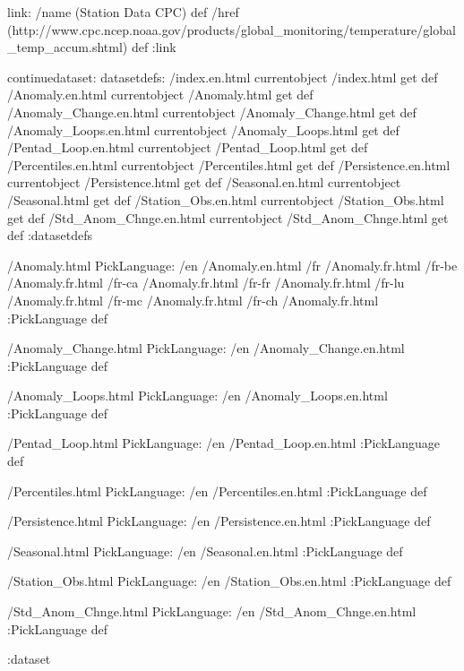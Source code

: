 
\begin{ingrid}
link:
/name (Station Data CPC) def
/href (http://www.cpc.ncep.noaa.gov/products/global_monitoring/temperature/global_temp_accum.shtml) def
:link

continuedataset:
datasetdefs:
/index.en.html currentobject /index.html get def
/Anomaly.en.html currentobject /Anomaly.html get def
/Anomaly_Change.en.html currentobject /Anomaly_Change.html get def
/Anomaly_Loops.en.html currentobject /Anomaly_Loops.html get def
/Pentad_Loop.en.html currentobject /Pentad_Loop.html get def
/Percentiles.en.html currentobject /Percentiles.html get def
/Persistence.en.html currentobject /Persistence.html get def
/Seasonal.en.html currentobject /Seasonal.html get def
/Station_Obs.en.html currentobject /Station_Obs.html get def
/Std_Anom_Chnge.en.html currentobject /Std_Anom_Chnge.html get def
:datasetdefs

/Anomaly.html {
PickLanguage:
/en /Anomaly.en.html
/fr /Anomaly.fr.html
/fr-be /Anomaly.fr.html
/fr-ca /Anomaly.fr.html
/fr-fr /Anomaly.fr.html
/fr-lu /Anomaly.fr.html
/fr-mc /Anomaly.fr.html
/fr-ch /Anomaly.fr.html
:PickLanguage
} def

/Anomaly_Change.html{
PickLanguage:
/en /Anomaly_Change.en.html
:PickLanguage
} def

/Anomaly_Loops.html{
PickLanguage:
/en /Anomaly_Loops.en.html
:PickLanguage
} def

/Pentad_Loop.html{
PickLanguage:
/en /Pentad_Loop.en.html
:PickLanguage
} def

/Percentiles.html{
PickLanguage:
/en /Percentiles.en.html
:PickLanguage
} def

/Persistence.html{
PickLanguage:
/en /Persistence.en.html
:PickLanguage
} def

/Seasonal.html{
PickLanguage:
/en /Seasonal.en.html
:PickLanguage
} def

/Station_Obs.html{
PickLanguage:
/en /Station_Obs.en.html
:PickLanguage
} def

/Std_Anom_Chnge.html{
PickLanguage:
/en /Std_Anom_Chnge.en.html
:PickLanguage
} def

:dataset

\end{ingrid}
